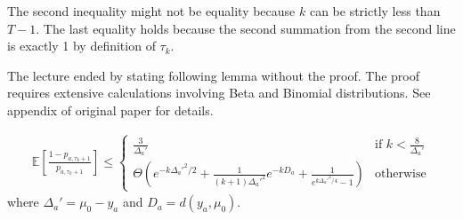 \documentclass[11pt]{article}
\begin{document}
The second inequality might not be equality because $k$ can be strictly less than $T-1$. The last equality holds because the second summation from the second line is exactly 1 by definition of $\tau_k$. 

The lecture ended by stating following lemma without the proof. The proof requires extensive calculations involving Beta and Binomial distributions. See appendix of original paper \cite{agrawal2013further} for details. 

\begin{lemma}
\begin{align*}
    \mathbb{E} [\frac{1 - p_{a, \tau_k + 1}}{p_{a, \tau_k +1}} ] \leq 
    \begin{cases}
    \frac{3}{\Delta_a'} &\text{if } k < \frac{8}{\Delta_a'} \\
    \Theta(e^{-k\Delta_a'^2/2} + \frac{1}{(k+1)\Delta_a'^2}e^{-kD_a} + \frac{1}{e^{k\Delta_a'^2/4} -1}) & \text{otherwise}
    \end{cases}
\end{align*}
where $\Delta_a' = \mu_0 - y_a$ and $D_a = d(y_a, \mu_0)$.
\end{lemma}
		

\end{document}

